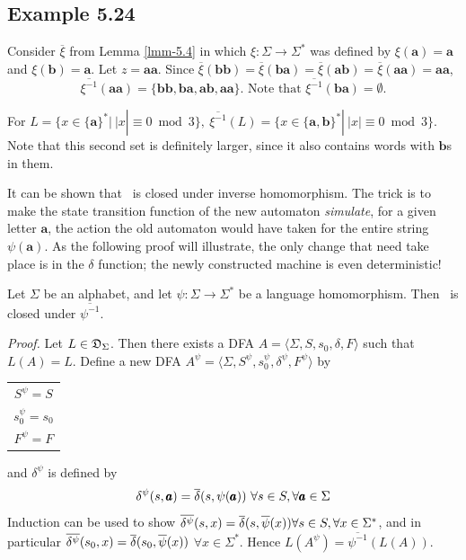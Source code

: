 \subsection*{Example 5.24}

Consider $\overline{\xi}$ from Lemma \ref{lmm-5.4} in which $\xi$$: \Sigma \rightarrow
\Sigma^*$ was defined by $\xi(\pmb{a})=\pmb{a}$ and $\xi(\pmb{b})=\pmb{a}$. Let
$z=\pmb{aa}$. Since $\overline{\xi}(\pmb{bb})=\overline{\xi}(\pmb{ba}) =
\overline{\xi}(\pmb{ab})=\overline{\xi}(\pmb{aa})=\pmb{aa}$,
\[ \overline{\xi^{-1}} (\pmb{aa})=\{\pmb{bb},\pmb{ba},\pmb{ab},\pmb{aa}\}
\text{. Note that } \overline{\xi^{-1}} (\pmb{ba})=\emptyset. \]

For $L=\{x \in\{\pmb{a}\}^*|\ |x|\equiv 0\bmod{3}\},\
\overline{\xi^{-1}} (L)=\{x\in\{\pmb{a},\pmb{b}\}^*|\ |x|\equiv 0\bmod{3}\}$.
Note that this second set is definitely larger, since it also contains words
with $\pmb{b}$s in them.

It can be shown that \DSIG\ is closed under inverse homomorphism. The trick is to
make the state transition function of the new automaton \emph{simulate}, for a
given letter $\pmb{a}$, the action the old automaton would have taken for the
entire string $\psi(\pmb{a})$. As the following proof will illustrate, the only
change that need take place is in the $\delta$ function; the newly constructed
machine is even deterministic!

\begin{thm}\label{thm-5.10}
Let $\Sigma$ be an alphabet, and let $\psi$$: \Sigma \rightarrow \Sigma^*$ be a
language homomorphism. Then \DSIG\ is closed under $\overline{\psi^{-1}}$.

\emph{Proof.} Let $L \in \mathfrak{D}_\Sigma$. Then there exists a DFA
$A=\langle\Sigma,S,s_0,\delta,F\rangle$ such that $L(A)=L$. Define a new DFA
$A^\psi=\langle\Sigma,S^\psi,s_0^\psi,\delta^\psi,F^\psi\rangle$ by
\begin{center}
\begin{tabular}{c}
$S^\psi = S$ \\
$s_0^\psi = s_0$ \\
$F^\psi = F$
\end{tabular}
\end{center}
and $\delta^\psi$ is defined by
\[ \delta^\psi(s,\pmb{a})=\overline{\delta}(s,\psi(\pmb{a}))\
		\forall s \in S, \forall \pmb{a} \in \Sigma \]
Induction can be used to show $\overline{\delta^\psi}(s,x)=\overline{\delta}(s,\overline{\psi}(x))\forall s \in S,
\forall x \in \Sigma^*$, and in particular $\overline{\delta^{\psi}}(s_0,x)=\overline{\delta}(s_0,\overline{\psi}(x))$
$\forall x \in \Sigma^*$. Hence $L(A^\psi)=\overline{\psi^{-1}}(L(A))$.
\end{thm}

